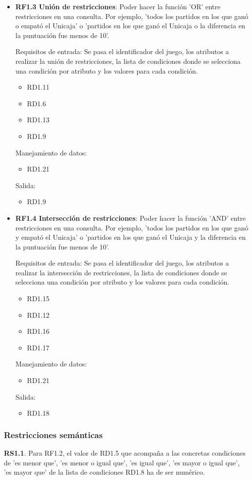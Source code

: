 \begin{itemize}
	
	\item \textbf{RF1.3 Unión de restricciones}: Poder hacer la función 'OR' entre restricciones en una consulta. Por ejemplo, 'todos los partidos en los que ganó o empató el Unicaja' o 'partidos en los que ganó el Unicaja o la diferencia en la puntuación fue menos de 10'.
	
	Requisitos de entrada: Se pasa el identificador del juego, los atributos a realizar la unión de restricciones, la lista de condiciones donde se selecciona una condición por atributo y los valores para cada condición.
	\begin{itemize}
		\item RD1.11
		\item RD1.6
		\item RD1.13
		\item RD1.9
	\end{itemize}
	Manejamiento de datos: 
	\begin{itemize}
		\item RD1.21
	\end{itemize}
	Salida:
	\begin{itemize}
		\item RD1.9
	\end{itemize}
	
	
	\item \textbf{RF1.4 Intersección de restricciones}: Poder hacer la función 'AND' entre restricciones en una consulta. Por ejemplo, 'todos los partidos en los que ganó y empató el Unicaja' o 'partidos en los que ganó el Unicaja y la diferencia en la puntuación fue menos de 10'.
	
	Requisitos de entrada: Se pasa el identificador del juego, los atributos a realizar la intersección de restricciones, la lista de condiciones donde se selecciona una condición por atributo y los valores para cada condición.
	\begin{itemize}
		\item RD1.15
		\item RD1.12
		\item RD1.16
		\item RD1.17
	\end{itemize}
	Manejamiento de datos: 
	\begin{itemize}
		\item RD1.21
	\end{itemize}
	Salida:
	\begin{itemize}
		\item RD1.18
	\end{itemize}
\end{itemize}




\subsubsection{Restricciones semánticas}

\textbf{RS1.1}. Para RF1.2, el valor de RD1.5 que acompaña a las concretas condiciones de 'es menor que', 'es menor o igual que', 'es igual que', 'es mayor o igual que', 'es mayor que' de la lista de condiciones RD1.8 ha de ser numérico.